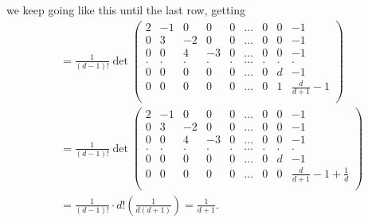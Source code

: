     we keep going like this until the last row, getting
    \begin{align*}
        &=\frac{1}{(d-1)!}\det\begin{pmatrix}
            2 & -1 &  0  & 0 & 0 &\dots & 0 & 0 & -1\\
            0 & 3  &  -2 & 0 & 0 &\dots & 0 & 0 & -1\\
            0 & 0  &  4 & -3 & 0 & \dots & 0 & 0 & -1\\
            . & .  &  . & . & . & \dots & . & . & .\\
            0 & 0  &  0 & 0 & 0 & \dots & 0 & d & -1\\
            0 & 0  &  0 & 0 & 0 &\dots & 0 & 1 & \frac{d}{d+1}-1\\
        \end{pmatrix}\\
        &=\frac{1}{(d-1)!}\det\begin{pmatrix}
            2 & -1 &  0  & 0 & 0 &\dots & 0 & 0 & -1\\
            0 & 3  &  -2 & 0 & 0 &\dots & 0 & 0 & -1\\
            0 & 0  &  4 & -3 & 0 & \dots & 0 & 0 & -1\\
            . & .  &  . & . & . & \dots & . & . & .\\
            0 & 0  &  0 & 0 & 0 & \dots & 0 & d & -1\\
            0 & 0  &  0 & 0 & 0 &\dots & 0 & 0 & \frac{d}{d+1}-1+\frac{1}{d}\\
        \end{pmatrix}\\
        &=\frac{1}{(d-1)!}\cdot d!(\frac{1}{d(d+1)})
        =\frac{1}{d+1}.
    \end{align*}

